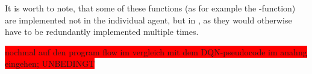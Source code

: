 It is worth to note, that some of these functions (as for example the -function) are implemented not in the individual agent, but in , as they would otherwise have to be redundantly implemented multiple times.





%
%
%




%
%



\colorbox{red}{nochmal auf den program flow im vergleich mit dem DQN-pseudocode im anahng eingehen; UNBEDINGT}


